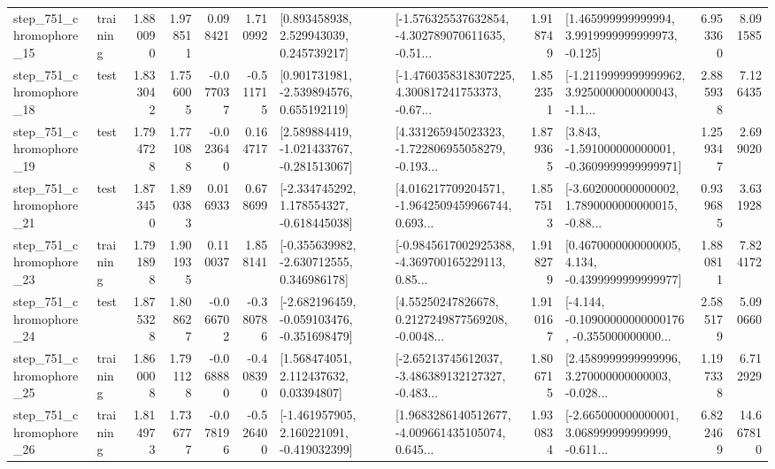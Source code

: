 \begin{tabular}{llrrrrllrlrr}
  step\_751\_chromophore\_15 &  training &      1.880090 &    1.978511 &      0.098421 &  1.710992 &     [0.893458938, 2.529943039, 0.245739217] &  [-1.576325537632854, -4.302789070611635, -0.51... &       1.918749 &    [1.465999999999994, 3.9919999999999973, -0.125] &            6.953360 &          8.091585 \\
  step\_751\_chromophore\_18 &      test &      1.833042 &    1.756005 &     -0.077037 & -0.511715 &    [0.901731981, -2.539894576, 0.655192119] &  [-1.4760358318307225, 4.300817241753373, -0.67... &       1.852351 &  [-1.2119999999999962, 3.9250000000000043, -1.1... &            2.885938 &          7.126435 \\
  step\_751\_chromophore\_19 &      test &      1.794728 &    1.771088 &     -0.023640 &  0.164717 &   [2.589884419, -1.021433767, -0.281513067] &  [4.331265945023323, -1.722806955058279, -0.193... &       1.879365 &   [3.843, -1.591000000000001, -0.3609999999999971] &            1.259347 &          2.699020 \\
  step\_751\_chromophore\_21 &      test &      1.873450 &    1.890383 &      0.016933 &  0.678699 &   [-2.334745292, 1.178554327, -0.618445038] &  [4.016217709204571, -1.9642509459966744, 0.693... &       1.857513 &  [-3.602000000000002, 1.7890000000000015, -0.88... &            0.939685 &          3.631928 \\
  step\_751\_chromophore\_23 &  training &      1.791898 &    1.901935 &      0.110037 &  1.858141 &   [-0.355639982, -2.630712555, 0.346986178] &  [-0.9845617002925388, -4.369700165229113, 0.85... &       1.918279 &   [0.4670000000000005, 4.134, -0.4399999999999977] &            1.880811 &          7.824172 \\
  step\_751\_chromophore\_24 &      test &      1.875328 &    1.808627 &     -0.066702 & -0.380786 &  [-2.682196459, -0.059103476, -0.351698479] &  [4.55250247826678, 0.2127249877569208, -0.0048... &       1.910167 &  [-4.144, -0.10900000000000176, -0.355000000000... &            2.585179 &          5.090660 \\
  step\_751\_chromophore\_25 &  training &      1.860008 &    1.791128 &     -0.068880 & -0.408390 &      [1.568474051, 2.112437632, 0.03394807] &  [-2.65213745612037, -3.486389132127327, -0.483... &       1.806715 &  [2.4589999999999996, 3.270000000000003, -0.028... &            1.197338 &          6.712929 \\
  step\_751\_chromophore\_26 &  training &      1.814973 &    1.736777 &     -0.078196 & -0.526400 &   [-1.461957905, 2.160221091, -0.419032399] &  [1.9683286140512677, -4.009661435105074, 0.645... &       1.930834 &  [-2.665000000000001, 3.068999999999999, -0.611... &            6.822469 &         14.667810 \\

\end{tabular}
